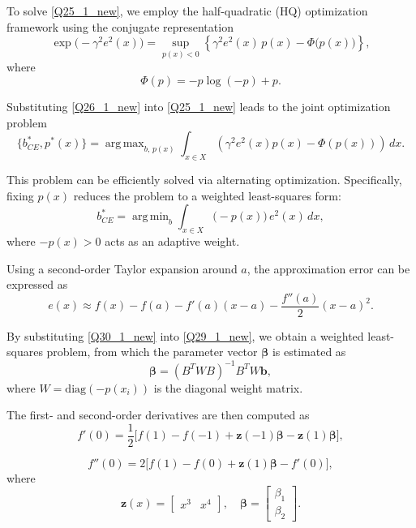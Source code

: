 \documentclass{elsarticle}
\DeclareMathOperator*{\argmax}{arg\,max}
\DeclareMathOperator*{\argmin}{arg\,min}
\begin{document}
To solve \eqref{Q25_1_new}, we employ the half-quadratic (HQ) optimization framework using the conjugate representation
\begin{equation}\label{Q26_1_new}
	\exp\big(-\gamma^2 e^2(x)\big) =
	\sup_{p(x) < 0}
	\left\{
	\gamma^2 e^2(x)\, p(x) - \Phi\big(p(x)\big)
	\right\},
\end{equation}
where
\begin{equation}
	\Phi(p) = -p \log(-p) + p.
\end{equation}

Substituting \eqref{Q26_1_new} into \eqref{Q25_1_new} leads to the joint optimization problem
\begin{equation}\label{Q28_1_new}
	\{b^*_{CE}, p^*(x)\} =
	\argmax_{b,\, p(x)}
	\int_{x \in X}
	\left(
	\gamma^2 e^2(x)p(x) - \Phi(p(x))
	\right)\, dx.
\end{equation}

This problem can be efficiently solved via alternating optimization. Specifically, fixing $p(x)$ reduces the problem to a weighted least-squares form:
\begin{equation}\label{Q29_1_new}
	b^*_{CE} =
	\argmin_{b}
	\int_{x \in X}
	\big(-p(x)\big)\, e^2(x) \, dx,
\end{equation}
where $-p(x) > 0$ acts as an adaptive weight.

Using a second-order Taylor expansion around $a$, the approximation error can be expressed as
\begin{equation}\label{Q30_1_new}
	e(x) \approx
	f(x) - f(a)
	- f'(a)(x-a)
	- \frac{f''(a)}{2}(x-a)^2.
\end{equation}

By substituting \eqref{Q30_1_new} into \eqref{Q29_1_new}, we obtain a weighted least-squares problem, from which the parameter vector $\boldsymbol{\beta}$ is estimated as
\begin{equation}\label{Q30_2_new}
	\boldsymbol{\beta} =
	(B^T W B)^{-1} B^T W \mathbf{b},
\end{equation}
where $W = \mathrm{diag}(-p(x_i))$ is the diagonal weight matrix.

The first- and second-order derivatives are then computed as
\begin{equation}\label{Q30_3_new}
	f'(0) =
	\frac{1}{2}
	\Big[
	f(1) - f(-1)
	+ \mathbf{z}(-1)\boldsymbol{\beta}
	-
	\mathbf{z}(1)\boldsymbol{\beta}
	\Big],
\end{equation}

\begin{equation}\label{Q30_4_new}
	f''(0) =
	2\Big[
	f(1) - f(0)
	+ \mathbf{z}(1)\boldsymbol{\beta}
	- f'(0)
	\Big],
\end{equation}
where
\begin{equation}
	\mathbf{z}(x) =
	\begin{bmatrix}
		x^3 & x^4
	\end{bmatrix},
	\quad
	\boldsymbol{\beta} =
	\begin{bmatrix}
		\beta_1 \\
		\beta_2
	\end{bmatrix}.
\end{equation}
\end{document}
